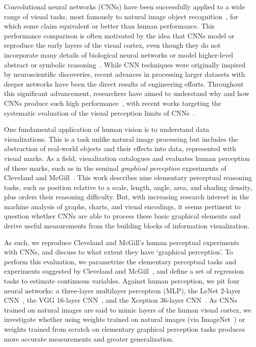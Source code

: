 
\maketitle

Convolutional neural networks (CNNs) have been successfully applied to a wide range of visual tasks, most famously to natural image object recognition~\cite{krizhevsky_imagenet2012, simonyan_very_deep2014, szegedy2015}, for which some claim equivalent or better than human performance. This performance comparison is often motivated by the idea that CNNs model or reproduce the early layers of the visual cortex, even though they do not incorporate many details of biological neural networks or model higher-level abstract or symbolic reasoning~\cite{yamins2016using, hassabis2017neuroscience, human_vs_machine_vision}. While CNN techniques were originally inspired by neuroscientific discoveries, recent advances in processing larger datasets with deeper networks have been the direct results of engineering efforts. Throughout this significant advancement, researchers have aimed to understand why and how CNNs produce such high performance~\cite{goodfellow_book, deeplearning_blackbox2017}, with recent works targeting the systematic evaluation of the visual perception limits of CNNs~\cite{clevr, not_so_clevr}.

One fundamental application of human vision is to understand data visualizations. This is a task unlike natural image processing but includes the abstraction of real-world objects and their effects into data, represented with visual marks. As a field, visualization catalogues and evaluates human perception of these marks, such as in the seminal \emph{graphical perception} experiments of Cleveland and McGill~\cite{cleveland_mcgill}. This work describes nine elementary perceptual reasoning tasks, such as position relative to a scale, length, angle, area, and shading density, plus orders their reasoning difficulty. But, with increasing research interest in the machine analysis of graphs, charts, and visual encodings, it seems pertinent to question whether CNNs are able to process these basic graphical elements and derive useful measurements from the building blocks of information visualization.

As such, we reproduce Cleveland and McGill's human perceptual experiments with CNNs, and discuss to what extent they have `graphical perception'. To perform this evaluation, we parametrize the elementary perceptual tasks and experiments suggested by Cleveland and McGill~\cite{cleveland_mcgill}, and define a set of regression tasks to estimate continuous variables. Against human perception, we pit four neural networks: a three-layer multilayer perceptron (MLP), the LeNet 2-layer CNN~\cite{lenet}, the VGG 16-layer CNN~\cite{simonyan_very_deep2014}, and the Xception 36-layer CNN~\cite{xception}. As CNNs trained on natural images are said to mimic layers of the human visual cortex, we investigate whether using weights trained on natural images (via ImageNet~\cite{imagenet}) or weights trained from scratch on elementary graphical perception tasks produces more accurate measurements and greater generalization.

